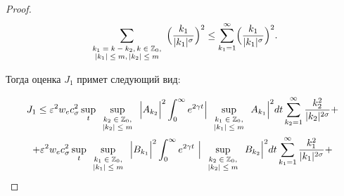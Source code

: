 \begin{proof}
$$

\sum_{

\scriptsize

\begin{array}{c}

k_1=k-k_2,k\in \mathbb Z_0,\\ 

|k_1|\le m,|k_2|\le m

\end{array}

} \Bigl(\frac{k_1}{|k_1|^\sigma}\Bigr)^2\le \sum_{k_1=1}^{\infty} \Bigl(\frac{k_1}{|k_1|^\sigma}\Bigr)^2.

$$

Тогда оценка $J_1$ примет следующий вид:

\begin{gather}

J_1\le \varepsilon^2 w_e c_\sigma^2 \sup_{t} 

\sup_{

\scriptsize

\begin{array}{c}

k_2\in \mathbb Z_0, \\

|k_2|\le m

\end{array}

}\Big|A_{k_2}\Big|^2  \int_0^\infty e^{2\gamma t} \Big| \sup_{\scriptsize \begin{array}{c} k_1\in \mathbb Z_0, \\ |k_1|\le m \end{array}}A_{k_1} \Big|^2dt\sum_{k_2=1}^\infty \frac{k_2^2}{|k_2|^{2\sigma}} +

\label{duh:slagaemoe1} 

\\

+\varepsilon^2 w_e c_\sigma^2 \sup_{t}\sup_{\scriptsize \begin{array}{c} k_1\in \mathbb Z_0, \\ |k_1|\le m \end{array}} \Big|B_{k_1}\Big|^2 \int_0^\infty e^{2\gamma t}~\Big| \sup_{\scriptsize \begin{array}{c} k_2\in \mathbb Z_0, \\ |k_2|\le m \end{array}}B_{k_2}\Big|^2dt\sum_{k_1=1}^{\infty}  \frac{k_1^2}{|k_1|^{2\sigma}}+ 

\label{duh:slagaemoe2}


\end{gather}
\end{proof}
